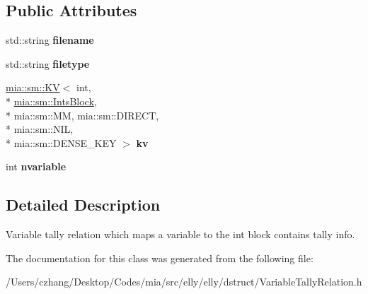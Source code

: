 \subsection*{Public Attributes}
\begin{DoxyCompactItemize}
\item 
\hypertarget{classmia_1_1elly_1_1dstruct_1_1_variable_tally_relation_a215fa9dcce3e8e1e6966187f6ec22fff}{std\-::string {\bfseries filename}}\label{classmia_1_1elly_1_1dstruct_1_1_variable_tally_relation_a215fa9dcce3e8e1e6966187f6ec22fff}

\item 
\hypertarget{classmia_1_1elly_1_1dstruct_1_1_variable_tally_relation_a352086250fc1f8190752fc6fb2695aa0}{std\-::string {\bfseries filetype}}\label{classmia_1_1elly_1_1dstruct_1_1_variable_tally_relation_a352086250fc1f8190752fc6fb2695aa0}

\item 
\hypertarget{classmia_1_1elly_1_1dstruct_1_1_variable_tally_relation_abd1e8a631336293a2799bd26e10f7ab5}{\hyperlink{classmia_1_1sm_1_1_k_v}{mia\-::sm\-::\-K\-V}$<$ int, \\*
\hyperlink{classmia_1_1sm_1_1_ints_block}{mia\-::sm\-::\-Ints\-Block}, \\*
mia\-::sm\-::\-M\-M, mia\-::sm\-::\-D\-I\-R\-E\-C\-T, \\*
mia\-::sm\-::\-N\-I\-L, \\*
mia\-::sm\-::\-D\-E\-N\-S\-E\-\_\-\-K\-E\-Y $>$ {\bfseries kv}}\label{classmia_1_1elly_1_1dstruct_1_1_variable_tally_relation_abd1e8a631336293a2799bd26e10f7ab5}

\item 
\hypertarget{classmia_1_1elly_1_1dstruct_1_1_variable_tally_relation_a1057afeffd94e72b1f7e1778ad0a268b}{int {\bfseries nvariable}}\label{classmia_1_1elly_1_1dstruct_1_1_variable_tally_relation_a1057afeffd94e72b1f7e1778ad0a268b}

\end{DoxyCompactItemize}


\subsection{Detailed Description}
Variable tally relation which maps a variable to the int block contains tally info. 

The documentation for this class was generated from the following file\-:\begin{DoxyCompactItemize}
\item 
/\-Users/czhang/\-Desktop/\-Codes/mia/src/elly/elly/dstruct/Variable\-Tally\-Relation.\-h\end{DoxyCompactItemize}
